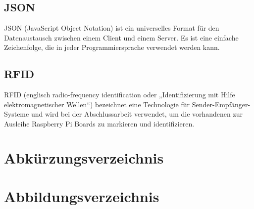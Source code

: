 \section*{JSON}
\label{sec:appendix:json}
JSON (JavaScript Object Notation) ist ein universelles Format für den Datenaustausch zwischen einem Client und einem Server. Es ist eine einfache Zeichenfolge, die in jeder Programmiersprache verwendet werden kann.

\section*{RFID}
\label{sec:appendix:rfid}
RFID (englisch radio-frequency identification oder „Identifizierung mit Hilfe elektromagnetischer Wellen“) bezeichnet eine Technologie für Sender-Empfänger-Systeme und wird bei der Abschlussarbeit verwendet, um die vorhandenen zur Ausleihe Raspberry Pi Boards zu markieren und identifizieren.
 

\chapter{Abkürzungsverzeichnis}
\label{sec:list_abbr}
\begin{acronym}[SEPSEP]
	
\end{acronym}


\chapter{Abbildungsverzeichnis}
\label{sec:list_img}
\renewcommand{\cftfigpresnum}{Abb. } 
\renewcommand{\listfigurename}{}
\setlength{\cftfignumwidth}{2 cm}
\listoffigures{}%

